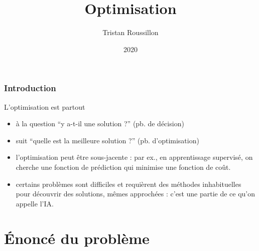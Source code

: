 \documentclass{beamer}
\title[]
 {Optimisation}
\author[T. Roussillon]
 {Tristan Roussillon}
\date{2020}
\institute{INSA Lyon, TC}
\begin{document}
\begin{frame}
  \titlepage
\end{frame}

\begin{frame}
  \frametitle{Introduction}

  \begin{block}{L'optimisation est partout}
  \begin{itemize}
  \item à la question ``y a-t-il une solution ?'' (pb. de décision)
  \item suit ``quelle est la meilleure solution ?'' (pb. d'optimisation)
  \item l'optimisation peut être sous-jacente : par ex., en apprentissage supervisé, on cherche
    une fonction de prédiction qui minimise une fonction de coût.
  \item certains problèmes sont difficiles et requièrent des méthodes inhabituelles pour découvrir
    des solutions, mêmes approchées : c'est une partie de ce qu'on appelle l'IA.
  \end{itemize}
  \end{block}
  
\end{frame}



\section{\'Enoncé du problème}
\end{document}
